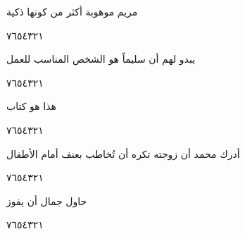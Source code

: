 \documentclass[11pt, a4paper]{article}
\begin{document}
{\vspace{0.5\baselineskip}\begin{flushright}
\textarabic{مريم موهوبة أكثر من كونها ذكية}
\end{flushright}

\begin{center}
        \hfill\textarabic{٧}\hfill\textarabic{٦}\hfill\textarabic{٥}\hfill\textarabic{٤}\hfill\textarabic{٣}\hfill\textarabic{٢}\hfill\textarabic{١}
        \end{center}


\vspace{0.5\baselineskip}\begin{flushright}
\textarabic{يبدو لهم أن سليماً هو الشخص المناسب للعمل}
\end{flushright}

\begin{center}
        \hfill\textarabic{٧}\hfill\textarabic{٦}\hfill\textarabic{٥}\hfill\textarabic{٤}\hfill\textarabic{٣}\hfill\textarabic{٢}\hfill\textarabic{١}
        \end{center}


\vspace{0.5\baselineskip}\begin{flushright}
\textarabic{هذا هو كتاب}
\end{flushright}

\begin{center}
        \hfill\textarabic{٧}\hfill\textarabic{٦}\hfill\textarabic{٥}\hfill\textarabic{٤}\hfill\textarabic{٣}\hfill\textarabic{٢}\hfill\textarabic{١}
        \end{center}


\vspace{0.5\baselineskip}\begin{flushright}
\textarabic{أدرك محمد أن زوجته تكره أن تُخاطب بعنف أمام الأطفال}
\end{flushright}

\begin{center}
        \hfill\textarabic{٧}\hfill\textarabic{٦}\hfill\textarabic{٥}\hfill\textarabic{٤}\hfill\textarabic{٣}\hfill\textarabic{٢}\hfill\textarabic{١}
        \end{center}


\vspace{0.5\baselineskip}\begin{flushright}
\textarabic{حاول جمال أن يفوز}
\end{flushright}

\begin{center}
        \hfill\textarabic{٧}\hfill\textarabic{٦}\hfill\textarabic{٥}\hfill\textarabic{٤}\hfill\textarabic{٣}\hfill\textarabic{٢}\hfill\textarabic{١}
        \end{center}


}
\end{document}

